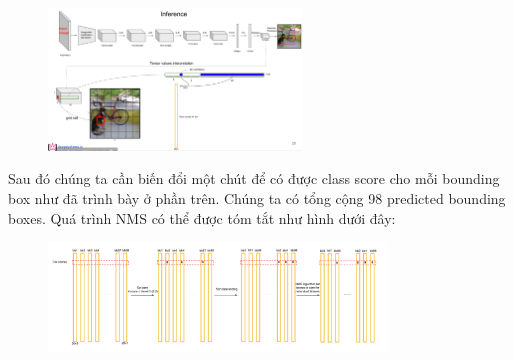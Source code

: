 \begin{figure}[htbp]
        \centering
        \includegraphics[width=0.6\textwidth]{images/2a-sign/yolo1_inference.png}
\end{figure}
Sau đó chúng ta cần biến đổi một chút để có được class score cho mỗi bounding box như đã trình bày ở phần trên. Chúng ta có tổng cộng 98 predicted bounding boxes. Quá trình NMS có thể được tóm tắt như hình dưới đây:
\newpage
\begin{figure}[h]
        \centering
        \includegraphics[width=0.8\textwidth]{images/2a-sign/yolo1_nms.png}
\end{figure}

